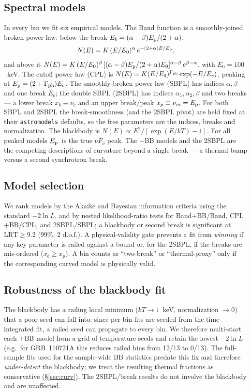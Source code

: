 \documentclass[twocolumn]{aastex631}
\newcommand{\nuc}{\ensuremath{\nu_c}}
\newcommand{\num}{\ensuremath{\nu_m}}
\newcommand{\Ep}{\ensuremath{E_{\rm p}}}
\newcommand{\kT}{\ensuremath{kT}}
\begin{document}
\subsection{Spectral models} \label{sec:models}
In every bin we fit six empirical models. The Band function \citep{Band1993} is a
smoothly-joined broken power law: below the break
$E_b=(\alpha-\beta)\Ep/(2+\alpha)$,
\begin{equation}
N(E)=K\,(E/E_0)^{\alpha}\,e^{-(2+\alpha)E/\Ep},
\end{equation}
and above it $N(E)=K\,(E/E_0)^{\beta}\,[(\alpha-\beta)\Ep/(2+\alpha)E_0]^{\alpha-\beta}\,e^{\beta-\alpha}$,
with $E_0=100$~keV. The cutoff power law
(CPL) is $N(E)=K(E/E_0)^{\Gamma_{\rm ph}}\exp(-E/E_c)$, peaking at
$\Ep=(2+\Gamma_{\rm ph})E_c$. The smoothly-broken power law (SBPL) has indices
$\alpha,\beta$ and one break $E_b$; the double SBPL (2SBPL) has indices
$\alpha_1,\alpha_2,\beta$ and two breaks --- a lower break $x_b\equiv\nuc$ and an
upper break/peak $x_p\equiv\num=\Ep$. For both SBPL and 2SBPL the break-smoothness
(and the 2SBPL pivot) are held fixed at their \texttt{astromodels} defaults, so
the free parameters are the indices, breaks and normalization. The blackbody is
$N(E)\propto E^2/[\exp(E/\kT)-1]$. For all peaked models \Ep\ is the true
$\nu F_\nu$ peak. The $+$BB models and the 2SBPL are the competing descriptions of
curvature beyond a single break --- a thermal bump versus a second synchrotron break.

\subsection{Model selection} \label{sec:select}
We rank models by the Akaike and Bayesian information criteria
\citep[AIC, BIC;][]{Akaike1974,Schwarz1978} using the standard $-2\ln L$, and by
nested likelihood-ratio tests \citep[LRT;][]{Wilks1938} for Band$+$BB/Band,
CPL$+$BB/CPL, and 2SBPL/SBPL; a blackbody or second break is significant at
$\mathrm{LRT}\ge9.2$ (99\%, 2 d.o.f.). A physical-validity gate prevents a fit
from \emph{winning} if any key parameter is railed against a bound or, for the
2SBPL, if the breaks are mis-ordered ($x_b\ge x_p$). A bin counts as
``two-break'' or ``thermal-proxy'' only if the corresponding curved model is
physically valid.

\subsection{Robustness of the blackbody fit} \label{sec:multistart}
The blackbody has a railing local minimum ($\kT\!\to\!1$~keV, normalization
$\to0$) that a poor seed can fall into; since per-bin fits are seeded from the
time-integrated fit, a railed seed can propagate to every bin. We therefore
multi-start each $+$BB model from a grid of temperature seeds and retain the
lowest $-2\ln L$ (e.g.\ for GRB~110721A this reduces railed bins from 12/13 to
0/13). The full-sample fits used for the sample-wide BB statistics predate this
fix and therefore \emph{under-detect} the blackbody; we treat the resulting
thermal fractions as conservative (\S\ref{sec:curv}). The 2SBPL/break results do
not involve the blackbody and are unaffected.
\end{document}
